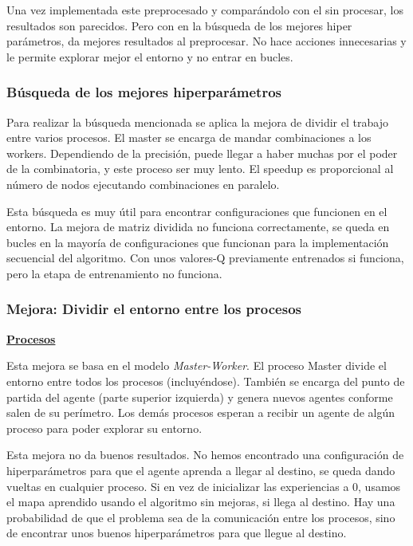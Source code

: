 		Una vez implementada este preprocesado y comparándolo con el sin procesar, los resultados son parecidos. Pero con en la búsqueda de los mejores hiper parámetros, da mejores resultados al preprocesar. No hace acciones innecesarias y le permite explorar mejor el entorno y no entrar en bucles.
		
	\subsubsection{Búsqueda de los mejores hiperparámetros}


		Para realizar la búsqueda mencionada se aplica la mejora de dividir el trabajo entre varios procesos. El master se encarga de mandar combinaciones a los workers. Dependiendo de la precisión, puede llegar a haber muchas por el poder de la combinatoria, y este proceso ser muy lento. El speedup es proporcional al número de nodos ejecutando combinaciones en paralelo.
		
		Esta búsqueda es muy útil para encontrar configuraciones que funcionen en el entorno.
		La mejora de matriz dividida no funciona correctamente, se queda en bucles en la mayoría de configuraciones que funcionan para la implementación secuencial del algoritmo. Con unos valores-Q previamente entrenados si funciona, pero la etapa de entrenamiento no funciona.

		
	
	\subsubsection{Mejora: Dividir el entorno entre los procesos}
	
		\begin{flushleft}
		\begin{mdframed}[roundcorner=5pt]		
			\textbf{\underline{Procesos}}
			\vspace{0.1cm}
			
			\scriptsize	
			Esta mejora se basa en el modelo \textit{Master-Worker}. El proceso Master divide el entorno entre todos los procesos (incluyéndose). También se encarga del punto de partida del agente (parte superior izquierda) y genera nuevos agentes conforme salen de su perímetro. Los demás procesos esperan a recibir un agente de algún proceso para poder explorar su entorno.
		\end{mdframed}
		\end{flushleft}	
		
		Esta mejora no da buenos resultados. No hemos encontrado una configuración de hiperparámetros para que el agente aprenda a llegar al destino, se queda dando vueltas en cualquier proceso. Si en vez de inicializar las experiencias a 0, usamos el mapa aprendido usando el algoritmo sin mejoras, si llega al destino. Hay una probabilidad de que el problema sea de la comunicación entre los procesos, sino de encontrar unos buenos hiperparámetros para que llegue al destino.
		
